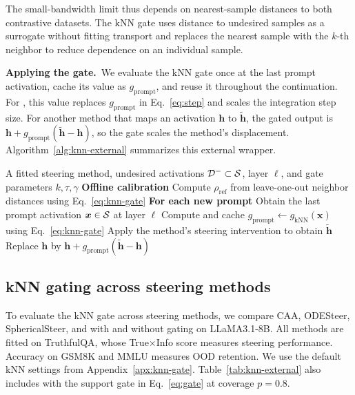 The small-bandwidth limit thus depends on nearest-sample distances to both contrastive datasets. The kNN gate uses distance to undesired samples as a surrogate without fitting transport and replaces the nearest sample with the $k$-th neighbor to reduce dependence on an individual sample.

\noindent\textbf{Applying the gate.}~We evaluate the kNN gate once at the last prompt activation, cache its value as $g_{\mathrm{prompt}}$, and reuse it throughout the continuation. For \Cobras, this value replaces $g_{\mathrm{prompt}}$ in Eq.~\eqref{eq:step} and scales the integration step size. For another method that maps an activation $\boldsymbol{h}$ to $\tilde{\boldsymbol{h}}$, the gated output is $\boldsymbol{h}+g_{\mathrm{prompt}}(\tilde{\boldsymbol{h}}-\boldsymbol{h})$, so the gate scales the method's displacement. Algorithm~\ref{alg:knn-external} summarizes this external wrapper.

\begin{algorithm}[t]
\caption{Applying the kNN gate to other steering methods}
\label{alg:knn-external}
\small
\begin{algorithmic}[1]
\Require A fitted steering method, undesired activations $\mathcal{D}^-\subset\mathcal{S}$, layer $\ell$, and gate parameters $k,\tau,\gamma$
\Statex \textbf{Offline calibration}
\State Compute $\rho_{\mathrm{ref}}$ from leave-one-out neighbor distances using Eq.~\eqref{eq:knn-gate}
\Statex \textbf{For each new prompt}
\State Obtain the last prompt activation $\boldsymbol{x}\in\mathcal{S}$ at layer $\ell$
\State Compute and cache $g_{\mathrm{prompt}}\gets g_{\mathrm{kNN}}(\boldsymbol{x})$ using Eq.~\eqref{eq:knn-gate}
    \State Apply the method's steering intervention to obtain $\tilde{\boldsymbol{h}}$
    \State Replace $\boldsymbol{h}$ by $\boldsymbol{h}+g_{\mathrm{prompt}}(\tilde{\boldsymbol{h}}-\boldsymbol{h})$
\EndFor
\end{algorithmic}
\end{algorithm}

\subsection{kNN gating across steering methods}
\label{apx:knn-external}

To evaluate the kNN gate across steering methods, we compare CAA, ODESteer, SphericalSteer, and \Cobras with and without gating on LLaMA3.1-8B. All methods are fitted on TruthfulQA, whose True$\times$Info score measures steering performance. Accuracy on GSM8K and MMLU measures OOD retention. We use the default kNN settings from Appendix~\ref{apx:knn-gate}. Table~\ref{tab:knn-external} also includes \Cobras with the support gate in Eq.~\eqref{eq:gate} at coverage $p=0.8$.

